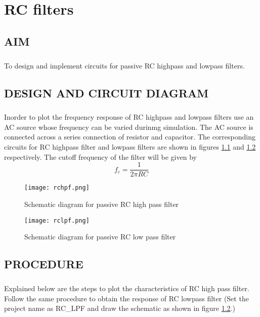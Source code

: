 \chapter{RC filters}

\section*{AIM}
\paragraph{}To design and implement circuits for passive RC highpass and lowpass filters.

\section*{DESIGN AND CIRCUIT DIAGRAM}
\paragraph{}

Inorder to plot the frequency response of RC highpass and lowpass filters use an AC source whose frequency can be varied durinmg simulation. The AC source is connected across a series connection of resistor and capacitor. The corresponding circuits for RC highpass filter and lowpass filters are shown in figures \ref{rchpf} and  \ref{rclpf} respectively. The cutoff frequency of the filter will be given by \begin{equation}
f_c=\frac{1}{2\pi RC}
\end{equation}

\begin{figure}[h]
\centering
\texttt{[image: rchpf.png]}
\caption{Schematic diagram for passive RC high pass filter}
\label{rchpf}
\end{figure}

\begin{figure}[h]
\centering
\texttt{[image: rclpf.png]}
\caption{Schematic diagram for passive RC low pass filter}
\label{rclpf}
\end{figure}

\section*{PROCEDURE}

\paragraph{}Explained below are the steps to plot the characteristics of RC high pass filter. Follow the same procedure to obtain the response of RC lowpass filter (Set the project name as RC\_LPF and draw the schematic as shown in figure \ref{rclpf}.)


